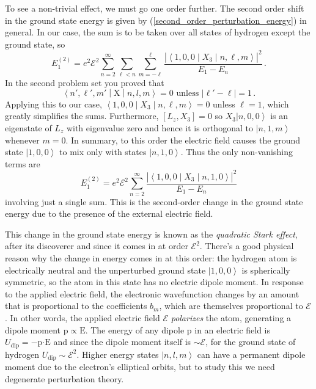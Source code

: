 \documentclass{article}
\theoremstyle{plain}\theoremheaderfont{\normalfont\itshape}\theorembodyfont{\rmfamily}\theoremseparator{.}\newtheorem*{rem}{Remark}\newtheorem*{ex}{Example}\newtheorem*{proof}{Proof}\newtheorem*{altp}{Alternative proof}
\theoremstyle{plain}\theoremheaderfont{\normalfont\bfseries}\theorembodyfont{\rmfamily}\theoremseparator{.}\newtheorem{thm}{Theorem}[section]\newtheorem{lem}[thm]{Lemma}\newtheorem{prop}[thm]{Proposition}\newtheorem*{cor}{Corollary}\newtheorem{defn}[thm]{Definition}\newtheorem{clm}[thm]{Claim}\newtheorem{clminproof}{Claim}
\theoremstyle{break}\theoremheaderfont{\normalfont\itshape}\theorembodyfont{\rmfamily}\theoremseparator{.\medskip}\newtheorem*{proofskip}{Proof}\newtheorem*{exs}{Examples}\newtheorem*{rems}{Remarks}
\theoremstyle{break}\theoremheaderfont{\normalfont\bfseries}\theorembodyfont{\rmfamily}\theoremseparator{.\medskip}\newtheorem{lemskip}[thm]{Lemma}\newtheorem{defnskip}[thm]{Definition}\newtheorem{propskip}[thm]{Proposition}\newtheorem{thmskip}[thm]{Theorem}
\numberwithin{equation}{section}
\newcommand{\ket}[1]{\left| #1 \right\rangle}
\newcommand{\mel}[3]{\left\langle #1 \middle| #2 \middle| #3 \right\rangle}
\newcommand{\vb}[1]{\bm{\mathrm{#1}}}
\newcommand{\vdot}{\bm{\cdot}}
\newcommand{\abs}[1]{\left| #1 \right|}
\begin{document}
    To see a non-trivial effect, we must go one order further. The second order shift in the ground state energy is given by (\ref{second_order_perturbation_energy}) in general. In our case, the sum is to be taken over all states of hydrogen except the ground state, so
    \begin{equation}
        E_1^{(2)}=e^2\mathcal{E}^2\sum_{n=2}^{\infty}\sum_{\ell<n}\sum_{m=-\ell}^{\ell}\frac{\abs{\mel{1,0,0}{X_3}{n,\ell,m}}^2}{E_1-E_n}\,.
    \end{equation}
    In the second problem set you proved that
    \begin{equation}
        \mel{n',\ell',m'}{\vb{X}}{n,l,m}=0\text{ unless }\abs{\ell'-\ell}=1\,.
    \end{equation}
    Applying this to our case, \(\mel{1,0,0}{X_3}{n,\ell,m}=0\) unless \(\ell=1\), which greatly simplifies the sums. Furthermore, \([L_z,X_3]=0\) so \(X_3\ket{n,0,0}\) is an eigenstate of \(L_z\) with eigenvalue zero and hence it is orthogonal to \(\ket{n,1,m}\) whenever \(m=0\). In summary, to this order the electric field causes the ground state \(\ket{1,0,0}\) to mix only with states \(\ket{n,1,0}\). Thus the only non-vanishing terms are
    \begin{equation}
        E_1^{(2)}=e^2\mathcal{E}^2\sum_{n=2}^{\infty}\frac{\abs{\mel{1,0,0}{X_3}{n,1,0}}^2}{E_1-E_n}
    \end{equation}
    involving just a single sum. This is the second-order change in the ground state energy due to the presence of the external electric field.

    This change in the ground state energy is known as the \textit{quadratic Stark effect}, after its discoverer and since it comes in at order \(\mathcal{E}^2\). There's a good physical reason why the change in energy comes in at this order: the hydrogen atom is electrically neutral and the unperturbed ground state \(\ket{1,0,0}\) is spherically symmetric, so the atom in this state has no electric dipole moment. In response to the applied electric field, the electronic wavefunction changes by an amount that is proportional to the coefficients \(b_m\), which are themselves proportional to \(\mathcal{E}\). In other words, the applied electric field \(\mathcal{E}\) \textit{polarizes} the atom, generating a dipole moment \(\vb{p}\propto \vb{E}\). The energy of any dipole \(\vb{p}\) in an electric field is \(U_{\text{dip}}=-\vb{p}\vdot\vb{E}\) and since the dipole moment itself is \(\sim\mathcal{E}\), for the ground state of hydrogen \(U_{\text{dip}}\sim\mathcal{E}^2\). Higher energy states \(\ket{n,l,m}\) can have a permanent dipole moment due to the electron's elliptical orbits, but to study this we need degenerate perturbation theory.
\end{document}
